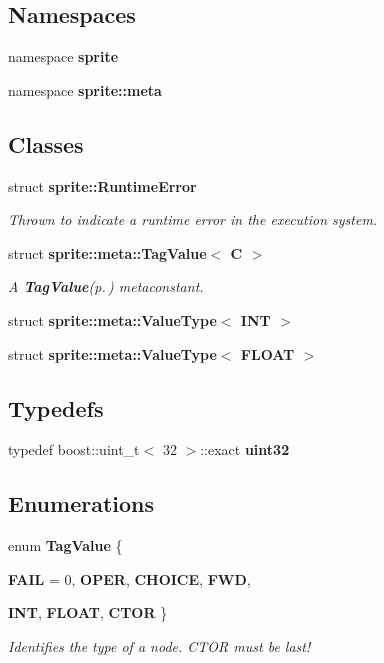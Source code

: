 \subsection*{Namespaces}
\begin{CompactItemize}
\item 
namespace {\bf sprite}
\item 
namespace {\bf sprite::meta}
\end{CompactItemize}
\subsection*{Classes}
\begin{CompactItemize}
\item 
struct {\bf sprite::Runtime\-Error}
\begin{CompactList}\small\item\em Thrown to indicate a runtime error in the execution system. \item\end{CompactList}\item 
struct {\bf sprite::meta::Tag\-Value$<$ C $>$}
\begin{CompactList}\small\item\em A {\bf Tag\-Value}{\rm (p.\,\pageref{structsprite_1_1meta_1_1TagValue})} metaconstant. \item\end{CompactList}\item 
struct {\bf sprite::meta::Value\-Type$<$ INT $>$}
\item 
struct {\bf sprite::meta::Value\-Type$<$ FLOAT $>$}
\end{CompactItemize}
\subsection*{Typedefs}
\begin{CompactItemize}
\item 
typedef boost::uint\_\-t$<$ 32 $>$::exact {\bf uint32}\label{namespacesprite_a11}

\end{CompactItemize}
\subsection*{Enumerations}
\begin{CompactItemize}
\item 
enum {\bf Tag\-Value} \{ \par
{\bf FAIL} = 0, 
{\bf OPER}, 
{\bf CHOICE}, 
{\bf FWD}, 
\par
{\bf INT}, 
{\bf FLOAT}, 
{\bf CTOR}
 \}
\begin{CompactList}\small\item\em Identifies the type of a node. CTOR must be last! \item\end{CompactList}\end{CompactItemize}
